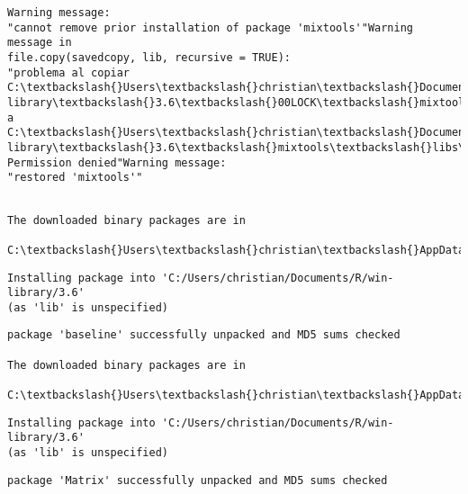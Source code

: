 \documentclass[11pt]{article}
\begin{document}
    \begin{Verbatim}[commandchars=\\\{\}]
Warning message:
"cannot remove prior installation of package 'mixtools'"Warning message in
file.copy(savedcopy, lib, recursive = TRUE):
"problema al copiar C:\textbackslash{}Users\textbackslash{}christian\textbackslash{}Documents\textbackslash{}R\textbackslash{}win-
library\textbackslash{}3.6\textbackslash{}00LOCK\textbackslash{}mixtools\textbackslash{}libs\textbackslash{}x64\textbackslash{}mixtools.dll  a
C:\textbackslash{}Users\textbackslash{}christian\textbackslash{}Documents\textbackslash{}R\textbackslash{}win-library\textbackslash{}3.6\textbackslash{}mixtools\textbackslash{}libs\textbackslash{}x64\textbackslash{}mixtools.dll:
Permission denied"Warning message:
"restored 'mixtools'"
    \end{Verbatim}

    \begin{Verbatim}[commandchars=\\\{\}]

The downloaded binary packages are in
        C:\textbackslash{}Users\textbackslash{}christian\textbackslash{}AppData\textbackslash{}Local\textbackslash{}Temp\textbackslash{}RtmpaY1B5e\textbackslash{}downloaded\_packages
    \end{Verbatim}

    \begin{Verbatim}[commandchars=\\\{\}]
Installing package into 'C:/Users/christian/Documents/R/win-library/3.6'
(as 'lib' is unspecified)
    \end{Verbatim}

    \begin{Verbatim}[commandchars=\\\{\}]
package 'baseline' successfully unpacked and MD5 sums checked

The downloaded binary packages are in
        C:\textbackslash{}Users\textbackslash{}christian\textbackslash{}AppData\textbackslash{}Local\textbackslash{}Temp\textbackslash{}RtmpaY1B5e\textbackslash{}downloaded\_packages
    \end{Verbatim}

    \begin{Verbatim}[commandchars=\\\{\}]
Installing package into 'C:/Users/christian/Documents/R/win-library/3.6'
(as 'lib' is unspecified)
    \end{Verbatim}

    \begin{Verbatim}[commandchars=\\\{\}]
package 'Matrix' successfully unpacked and MD5 sums checked
    \end{Verbatim}
\end{document}
